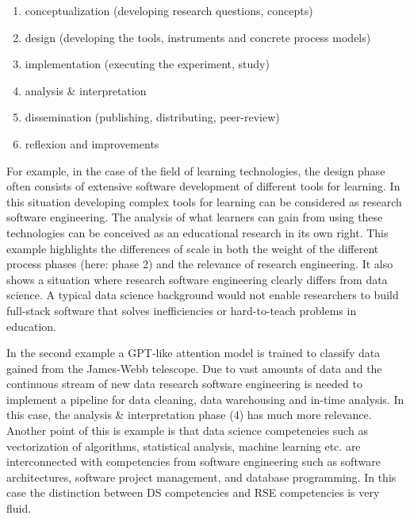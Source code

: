 \documentclass[
        english,biblatex
    ]{lni}
\providecommand{\tightlist}{%
    \setlength{\itemsep}{0pt}\setlength{\parskip}{0pt}}
\begin{document}
    \begin{enumerate}
    \def\labelenumi{\arabic{enumi}.}
    \tightlist
    \item
      conceptualization (developing research questions, concepts)
    \item
      design (developing the tools, instruments and concrete process
      models)
    \item
      implementation (executing the experiment, study)
    \item
      analysis \& interpretation
    \item
      dissemination (publishing, distributing, peer-review)
    \item
      reflexion and improvements
    \end{enumerate}

    For example, in the case of the field of learning technologies, the
    design phase often consists of extensive software development of
    different tools for learning. In this situation developing complex
    tools for learning can be considered as research software
    engineering. The analysis of what learners can gain from using these
    technologies can be conceived as an educational research in its own
    right. This example highlights the differences of scale in both the
    weight of the different process phases (here: phase 2) and the
    relevance of research engineering. It also shows a situation where
    research software engineering clearly differs from data science. A
    typical data science background would not enable researchers to
    build full-stack software that solves inefficiencies or
    hard-to-teach problems in education.

    In the second example a GPT-like attention model is trained to
    classify data gained from the James-Webb telescope. Due to vast
    amounts of data and the continuous stream of new data research
    software engineering is needed to implement a pipeline for data
    cleaning, data warehousing and in-time analysis. In this case, the
    analysis \& interpretation phase (4) has much more relevance.
    Another point of this is example is that data science competencies
    such as vectorization of algorithms, statistical analysis, machine
    learning etc. are interconnected with competencies from software
    engineering such as software architectures, software project
    management, and database programming. In this case the distinction
    between DS competencies and RSE competencies is very fluid.
\end{document}
